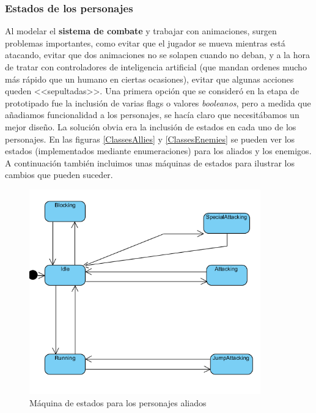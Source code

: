\subsubsection{Estados de los personajes}

Al modelar el \textbf{sistema de combate} y trabajar con animaciones, surgen problemas importantes, como evitar que el jugador se mueva mientras está atacando, evitar que dos animaciones no se solapen cuando no deban, y a la hora de tratar con controladores de inteligencia artificial (que mandan ordenes mucho más rápido que un humano en ciertas ocasiones), evitar que algunas acciones queden <<sepultadas>>. Una primera opción que se consideró en la etapa de prototipado fue la inclusión de varias flags o valores \textit{booleanos}, pero a medida que añadiamos funcionalidad a los personajes, se hacía claro que necesitábamos un mejor diseño. La solución obvia era la inclusión de estados en cada uno de los personajes. En las figuras \ref{ClassesAllies} y \ref{ClassesEnemies} se pueden ver los estados (implementados mediante enumeraciones) para los aliados y los enemigos. A continuación también incluimos unas máquinas de estados para ilustrar los cambios que pueden suceder.


\begin{figure}[H]
  \centering
  \includegraphics[width=10cm]{./images/SM_Ally.png}
  \caption{Máquina de estados para los personajes aliados}
  \label{AllySM}
\end{figure}

